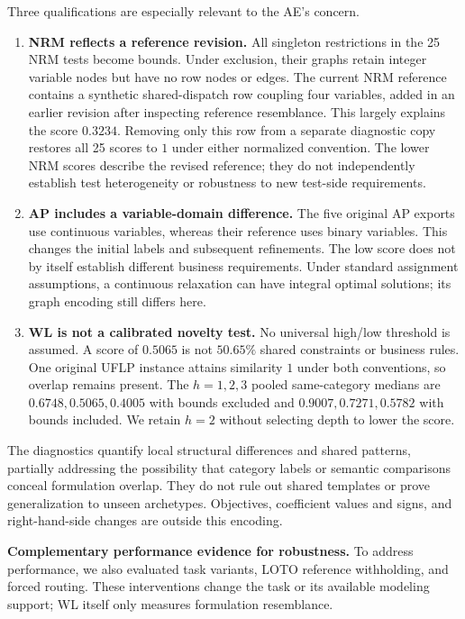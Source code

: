 \documentclass[10pt]{article}
\begin{document}
Three qualifications are especially relevant to the AE's concern.
\begin{enumerate}
\item \textbf{NRM reflects a reference revision.}
All singleton restrictions in the 25 NRM tests become bounds.
Under exclusion, their graphs retain integer variable nodes but
have no row nodes or edges.
The current NRM reference contains a synthetic shared-dispatch row
coupling four variables, added in an earlier revision after
inspecting reference resemblance. This largely explains the score
$0.3234$. Removing only this row from a separate diagnostic copy
restores all 25 scores to $1$ under either normalized convention.
The lower NRM scores describe the revised reference; they do not
independently establish test heterogeneity or robustness to new
test-side requirements.

\item \textbf{AP includes a variable-domain difference.}
The five original AP exports use continuous variables, whereas their
reference uses binary variables. This changes the initial labels
and subsequent refinements. The low score does not by itself
establish different business requirements.
Under standard assignment assumptions, a continuous relaxation can
have integral optimal solutions; its graph encoding still differs here.

\item \textbf{WL is not a calibrated novelty test.}
No universal high/low threshold is assumed.
A score of $0.5065$ is not $50.65\%$ shared constraints or business rules.
One original UFLP instance attains similarity $1$ under both
conventions, so overlap remains present.
The $h=1,2,3$ pooled same-category medians are
$0.6748,0.5065,0.4005$ with bounds excluded and
$0.9007,0.7271,0.5782$ with bounds included.
We retain $h=2$ without selecting depth to lower the score.
\end{enumerate}

The diagnostics quantify local structural differences and shared
patterns, partially addressing the possibility that category labels
or semantic comparisons conceal formulation overlap.
They do not rule out shared templates or prove generalization to
unseen archetypes. Objectives, coefficient values and signs, and
right-hand-side changes are outside this encoding.

\medskip
\textbf{Complementary performance evidence for robustness.}
To address performance, we also evaluated task variants, LOTO
reference withholding, and forced routing.
These interventions change the task or its available modeling
support; WL itself only measures formulation resemblance.
\end{document}
